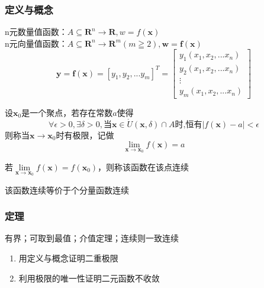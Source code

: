 \subsubsection{定义与概念}
\begin{definition}
	n元数量值函数：$A\subseteq \mathbf{R}^n \to \mathbf{R},  w=f(\bm{x}) $\\
	n元向量值函数：$ A\subseteq \mathbf{R}^n \to \mathbf{R}^m(m\geqq 2),  \bm{w}=\bm{f}(\bm{x})  $
	\begin{equation}\label{key}
		\bm{y}=\bm{f}(\bm{x})=[y_1,y_2,...y_m]^T=\begin{bmatrix}
			y_1(x_1,x_2,...x_n)\\
			y_2(x_1,x_2,...x_n)\\
			\vdots\\
			y_m(x_1,x_2,...x_n)
		\end{bmatrix}  
	\end{equation}
\end{definition}
\begin{definition}[n重极限]
	设$ \bm{x}_0 $是一个聚点，若存在常数$ a $使得
	\begin{equation}\label{key}
		\forall \epsilon>0,\exists \delta>0,\text{当}\bm{x}\in \mathring{U}(\bm{x},\delta) \cap A\text{时,恒有}|f(\bm{x})-a|<\epsilon
	\end{equation}
则称当$ \bm{x}\to \bm{x}_0 $时有极限，记做\begin{equation}\label{key}
	\lim\limits_{\bm{x}\to \bm{x}_0}f(\bm{x})=a
\end{equation}
\end{definition}
\begin{definition}
	若$\lim\limits_{\bm{x}\to \bm{x}_0}f(\bm{x})=f(\bm{x}_0)$，则称该函数在该点连续
\end{definition}
\begin{remark}
	该函数连续等价于个分量函数连续
\end{remark}
\subsubsection{定理}
\begin{theorem}[有界闭区域上连续函数的性质]
	有界；可取到最值；介值定理；连续则一致连续
\end{theorem}
\begin{application}
	\begin{enumerate}
		\item 用定义与概念证明二重极限
		\item 利用极限的唯一性证明二元函数不收敛
	\end{enumerate}
\end{application}

